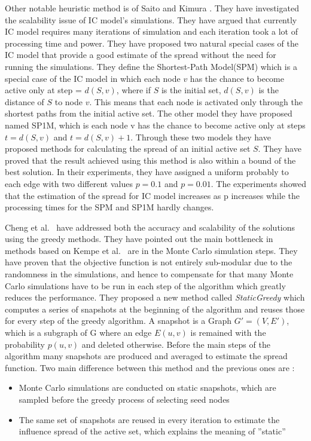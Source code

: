 \documentclass[english]{tktltiki}
\begin{document}
Other notable heuristic method is of Saito and Kimura \cite{kimura06}. They have investigated the scalability issue of IC model's simulations. They have argued that currently IC model requires many iterations of simulation and each iteration took a lot of processing time and power. They have proposed two natural special cases of the IC model that provide a good estimate of the spread without the need for running the simulations. They define the Shortest-Path Model(SPM) which is a special case of the IC model in which each node $v$ has the chance to become active only at step = $d(S,v)$, where if $S$ is the initial set, $d(S,v)$ is the distance of $S$ to node $v$. This means that each node is activated only through the shortest paths from the initial active set. The other model they have proposed named SP1M, which is each node v has the chance to become active only at steps $t = d(S,v)$ and $t =d(S,v) + 1$. Through these two models they have proposed methods for calculating the spread of an initial active set $S$. They have proved that the result achieved using this method is also within a bound of the best solution. In their experiments, they have assigned a uniform probably to each edge with two different values $p = 0.1$ and $p =0.01$. The experiments showed that the estimation of the spread for IC model increases as p increases while the processing times for the SPM and SP1M hardly changes. 

Cheng et al.\ \cite{cheng13} have addressed both the accuracy and scalability of the solutions using the greedy methods. They have pointed out the main bottleneck in methods based on Kempe et al.\ \cite{kempe03} are in the Monte Carlo simulation steps. They have proven that the objective function is not entirely sub-modular due to the randomness in the simulations, and hence to compensate for that many Monte Carlo simulations have to be run in each step of the algorithm which greatly reduces the performance.
They proposed a new method called \textit{StaticGreedy} which computes a series of snapshots at the beginning of the algorithm and reuses those for every step of the greedy algorithm. A snapshot is a Graph $G'=(V,E')$, which is a subgraph of G where an edge $E(u,v)$ is remained with the probability $p(u,v)$ and deleted otherwise. 
Before the main steps of the algorithm many snapshots are produced and averaged to estimate the spread function. 
Two main difference between this method and the previous ones are :
\begin{itemize}
\item
Monte Carlo simulations are conducted on static snapshots, which are sampled before the greedy process of selecting seed nodes
\item
The same set of snapshots are reused in every iteration to estimate the influence spread of the active set, which explains the meaning of ''static''
\end{itemize}
\end{document}
